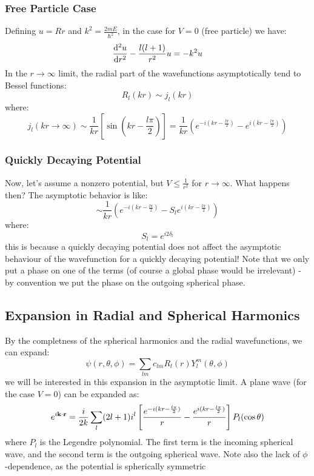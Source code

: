 \subsubsection{Free Particle Case}
Defining $u = Rr$ and $k^2 = \frac{2mE}{\hbar^2}$, in the case for $V = 0$ (free particle) we have:
\begin{equation}
    \dod[2]{u}{r} - \frac{l(l+1)}{r^2}u = -k^2 u
\end{equation}
In the $r \to \infty$ limit, the radial part of the wavefunctions asymptotically tend to Bessel functions:
\begin{equation}
    R_l(kr) \sim j_l(kr)
\end{equation}
where:
\begin{equation}
    j_l(kr \to \infty) \sim \frac{1}{kr}\left[\sin(kr - \frac{l\pi}{2})\right] = \frac{1}{kr}\left(e^{-i(kr - \frac{l\pi}{2})} - e^{i(kr - \frac{l\pi}{2})}\right)
\end{equation}

\subsubsection{Quickly Decaying Potential}
Now, let's assume a nonzero potential, but $V \leq \frac{1}{r^2}$ for $r \to \infty$. What happens then? The asymptotic behavior is like:
\begin{equation}
    \sim \frac{1}{kr}\left(e^{-i(kr - \frac{l\pi}{2})} - S_le^{i(kr - \frac{l\pi}{2})}\right)
\end{equation}
where:
\begin{equation}
    S_l = e^{i2\delta_l}
\end{equation}
this is because a quickly decaying potential does not affect the asymptotic behaviour of the wavefunction for a quickly decaying potential! Note that we only put a phase on one of the terms (of course a global phase would be irrelevant) - by convention we put the phase on the outgoing spherical phase.

\subsection{Expansion in Radial and Spherical Harmonics}
By the completness of the spherical harmonics and the radial wavefunctions, we can expand:
\begin{equation}
    \psi(r, \theta, \phi) = \sum_{lm}c_{lm}R_l(r)Y_{l}^m(\theta, \phi)
\end{equation}
we will be interested in this expansion in the asymptotic limit. A plane wave (for the case $V = 0$) can be expanded as:
\begin{equation}
    e^{i\mathbf{k}\cdot\mathbf{r}} = \frac{i}{2k}\sum_l(2l+1)i^l \left[\frac{e^{-i(kr - \frac{l\pi}{2})}}{r} - \frac{e^{i(kr - \frac{l\pi}{2})}}{r}\right]P_l(\cos\theta)
\end{equation}
where $P_l$ is the Legendre polynomial. The first term is the incoming spherical wave, and the second term is the outgoing spherical wave. Note also the lack of $\phi$-dependence, as the potential is spherically symmetric


